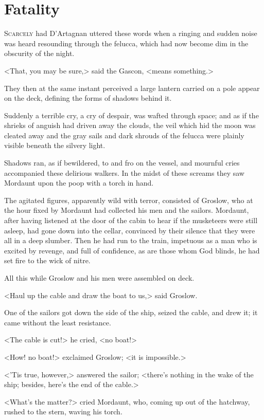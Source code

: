 \chapter{Fatality}

 \lettrine{S}{carcely} had D'Artagnan uttered these words when a ringing and sudden noise was heard resounding through the felucca, which had now become dim in the obscurity of the night.

\zz
<That, you may be sure,> said the Gascon, <means something.>

They then at the same instant perceived a large lantern carried on a pole appear on the deck, defining the forms of shadows behind it.

Suddenly a terrible cry, a cry of despair, was wafted through space; and as if the shrieks of anguish had driven away the clouds, the veil which hid the moon was cleated away and the gray sails and dark shrouds of the felucca were plainly visible beneath the silvery light.

Shadows ran, as if bewildered, to and fro on the vessel, and mournful cries accompanied these delirious walkers. In the midst of these screams they saw Mordaunt upon the poop with a torch in hand.

The agitated figures, apparently wild with terror, consisted of Groslow, who at the hour fixed by Mordaunt had collected his men and the sailors. Mordaunt, after having listened at the door of the cabin to hear if the musketeers were still asleep, had gone down into the cellar, convinced by their silence that they were all in a deep slumber. Then he had run to the train, impetuous as a man who is excited by revenge, and full of confidence, as are those whom God blinds, he had set fire to the wick of nitre.

All this while Groslow and his men were assembled on deck.

<Haul up the cable and draw the boat to us,> said Groslow.

One of the sailors got down the side of the ship, seized the cable, and drew it; it came without the least resistance.

<The cable is cut!> he cried, <no boat!>

<How! no boat!> exclaimed Groslow; <it is impossible.>

<'Tis true, however,> answered the sailor; <there's nothing in the wake of the ship; besides, here's the end of the cable.>

<What's the matter?> cried Mordaunt, who, coming up out of the hatchway, rushed to the stern, waving his torch.

